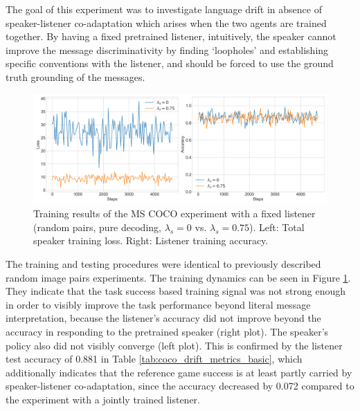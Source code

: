 The goal of this experiment was to investigate language drift in absence of speaker-listener co-adaptation which arises when the two agents are trained together. By having a fixed pretrained listener, intuitively, the speaker cannot improve the message discriminativity by finding `loopholes' and establishing specific conventions with the listener, and should be forced to use the ground truth grounding of the messages.

\begin{figure}[h]
	\centering
	\includegraphics[width=\linewidth]{images/coco_fixedListener_baseline_random_0_075_losses.png}
	\caption{Training results of the MS COCO experiment with a fixed listener (random pairs, pure decoding, $\lambda_s=0$ vs. $\lambda_s=0.75$). Left: Total speaker training loss. Right: Listener training accuracy.}
	\label{fig:coco_fixed_listener_speaker_loss_listener_acc_075}
\end{figure}

The training and testing procedures were identical to previously described random image pairs experiments. The training dynamics can be seen in Figure \ref{fig:coco_fixed_listener_speaker_loss_listener_acc_075}. They indicate that the task success based training signal was not strong enough in order to visibly improve the task performance beyond literal message interpretation, because the listener's accuracy did not improve beyond the accuracy in responding to the pretrained speaker (right plot). The speaker's policy also did not visibly converge (left plot). 
This is confirmed by the listener test accuracy of 0.881 in Table \ref{tab:coco_drift_metrics_basic}, which additionally indicates that the reference game success is at least partly carried by speaker-listener co-adaptation, since the accuracy decreased by 0.072 compared to the experiment with a jointly trained listener. 


